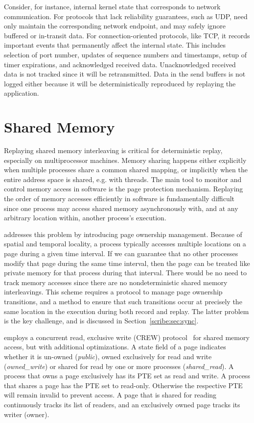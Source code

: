 \begin{table}[]
Consider, for instance, internal kernel state that corresponds to
network communication. For protocols that lack reliability guarantees,
such as UDP, \scribe{} need only maintain the corresponding network
endpoint, and may safely ignore buffered or
in-transit data. For connection-oriented protocols, like TCP, it
records important events that permanently affect the internal
state. This includes selection of port number, updates of sequence
numbers and timestamps, setup of timer expirations, and acknowledged
received data. Unacknowledged received data is not tracked since it
will be retransmitted. Data in the send buffers is not logged either
because it will be deterministically reproduced by replaying the
application.

  
\section{Shared Memory}
\label{scribe:sec:memory}

Replaying shared memory interleaving is critical for deterministic
replay, especially on multiprocessor machines.  Memory sharing happens
either explicitly when multiple processes share a common shared
mapping, or implicitly when the entire address space is shared,
e.g. with threads.  The main tool to monitor and control memory
access in software is the page protection mechanism.  Replaying the
order of memory accesses efficiently in software is fundamentally
difficult since one process may access shared memory asynchronously
with, and at any arbitrary location within, another process's
execution.

   

\scribe{} addresses this problem by introducing page ownership
management. Because of spatial and temporal locality, a process
typically accesses multiple locations on a page during a given time
interval.  If we can guarantee that no other processes modify that
page during the same time interval, then the page can be treated like
private memory for that process during that interval.  There would be
no need to track memory accesses since there are no nondeterministic
shared memory interleavings. This scheme requires a
protocol to manage page ownership transitions, and a method to ensure
that such transitions occur at precisely the same location in the
execution during both record and replay. The latter problem is the
key challenge, and is discussed in Section~\ref{scribe:sec:sync}.

\scribe{} employs a concurrent read, exclusive write (CREW)
protocol~\cite{crew,instant-replay} for shared memory access, but with
additional optimizations.  A state
field of a page indicates whether it is un-owned ({\em public}), owned
exclusively for read and write ({\em owned\_write}) or shared for read
by one or more processes ({\em shared\_read}). A process that owns
a page exclusively has its PTE set as read and write. A process that
shares a page has the PTE set to read-only. Otherwise the respective
PTE will remain invalid to prevent access. A page that is shared for
reading continuously tracks its list of readers, and an exclusively
owned page tracks its writer (owner).


\end{table}
